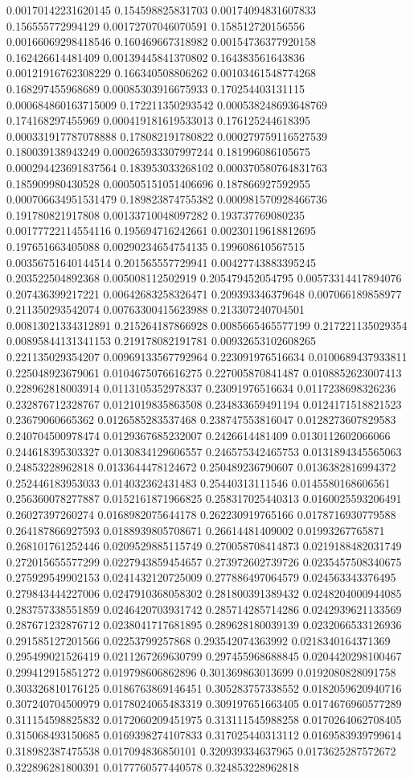\begin{table}
\begin{tabu}
\begin{sparkline}{10}
0.00170142231620145 0.154598825831703 0.00174094831607833 0.156555772994129 0.00172707046070591 0.158512720156556 0.00166069298418546 0.160469667318982 0.00154736377920158 0.162426614481409 0.00139445841370802 0.164383561643836 0.00121916762308229 0.166340508806262 0.00103461548774268 0.168297455968689 0.00085303916675933 0.170254403131115 0.000684860163715009 0.172211350293542 0.000538248693648769 0.174168297455969 0.000419181619533013 0.176125244618395 0.000331917787078888 0.178082191780822 0.000279759116527539 0.180039138943249 0.000265933307997244 0.181996086105675 0.000294423691837564 0.183953033268102 0.000370580764831763 0.185909980430528 0.000505151051406696 0.187866927592955 0.000706634951531479 0.189823874755382 0.000981570928466736 0.191780821917808 0.00133710048097282 0.193737769080235 0.00177722114554116 0.195694716242661 0.00230119618812695 0.197651663405088 0.00290234654754135 0.199608610567515 0.00356751640144514 0.201565557729941 0.00427743883395245 0.203522504892368 0.005008112502919 0.205479452054795 0.00573314417894076 0.207436399217221 0.00642683258326471 0.209393346379648 0.007066189858977 0.211350293542074 0.00763300415623988 0.213307240704501 0.00813021334312891 0.215264187866928 0.0085665465577199 0.217221135029354 0.00895844131341153 0.219178082191781 0.00932653102608265 0.221135029354207 0.00969133567792964 0.223091976516634 0.0100689437933811 0.225048923679061 0.0104675076616275 0.227005870841487 0.0108852623007413 0.228962818003914 0.0113105352978337 0.23091976516634 0.0117238698326236 0.232876712328767 0.0121019835863508 0.234833659491194 0.0124171518821523 0.23679060665362 0.0126585283537468 0.238747553816047 0.0128273607829583 0.240704500978474 0.0129367685232007 0.2426614481409 0.0130112602066066 0.244618395303327 0.0130834129606557 0.246575342465753 0.0131894345565063 0.24853228962818 0.0133644478124672 0.250489236790607 0.0136382816994372 0.252446183953033 0.014032362431483 0.25440313111546 0.0145580168606561 0.256360078277887 0.0152161871966825 0.258317025440313 0.0160025593206491 0.26027397260274 0.0168982075644178 0.262230919765166 0.0178716930779588 0.264187866927593 0.0188939805708671 0.26614481409002 0.01993267765871 0.268101761252446 0.0209529885115749 0.270058708414873 0.0219188482031749 0.272015655577299 0.0227943859454657 0.273972602739726 0.0235457508340675 0.275929549902153 0.0241432120725009 0.277886497064579 0.024563343376495 0.279843444227006 0.0247910368058302 0.281800391389432 0.0248204000944085 0.283757338551859 0.0246420703931742 0.285714285714286 0.0242939621133569 0.287671232876712 0.0238041717681895 0.289628180039139 0.0232066533126936 0.291585127201566 0.02253799257868 0.293542074363992 0.0218340164371369 0.295499021526419 0.0211267269630799 0.297455968688845 0.0204420298100467 0.299412915851272 0.019798606862896 0.301369863013699 0.0192080828091758 0.303326810176125 0.0186763869146451 0.305283757338552 0.0182059620940716 0.307240704500979 0.0178024065483319 0.309197651663405 0.0174676960577289 0.311154598825832 0.0172060209451975 0.313111545988258 0.0170264062708405 0.315068493150685 0.0169398274107833 0.317025440313112 0.0169583939799614 0.318982387475538 0.017094836850101 0.320939334637965 0.0173625287572672 0.322896281800391 0.0177760577440578 0.324853228962818 
\end{sparkline}
\end{tabu}
\end{table}
